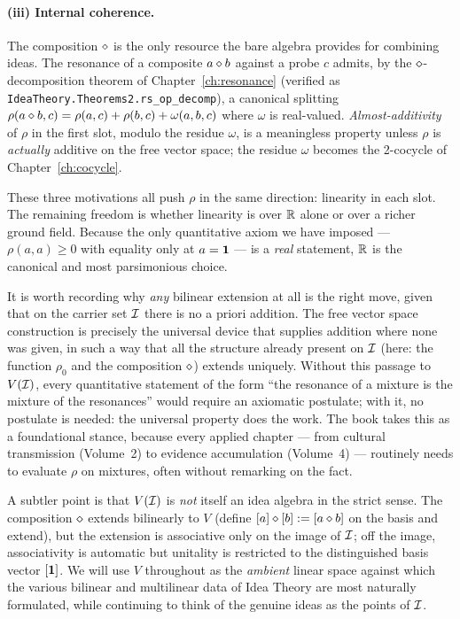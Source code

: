 \paragraph{(iii) Internal coherence.}
The composition $\mathbin{\diamond}$ is the only resource the bare algebra provides
for combining ideas. The resonance of a composite $a\mathbin{\diamond} b$ against a
probe $c$ admits, by the $\mathbin{\diamond}$-decomposition theorem of
Chapter~\ref{ch:resonance} (verified as
\texttt{IdeaTheory.Theorems2.rs\_op\_decomp}), a canonical splitting
$\rho(a\mathbin{\diamond} b,c)=\rho(a,c)+\rho(b,c)+\omega(a,b,c)$ where $\omega$ is
real-valued. \emph{Almost-additivity} of $\rho$ in the first slot, modulo
the residue $\omega$, is a meaningless property unless $\rho$ is
\emph{actually} additive on the free vector space; the residue $\omega$
becomes the 2-cocycle of Chapter~\ref{ch:cocycle}.

These three motivations all push $\rho$ in the same direction: linearity in
each slot. The remaining freedom is whether linearity is over $\mathbb{R}$ alone
or over a richer ground field. Because the only quantitative axiom we have
imposed --- $\rho(a,a)\ge 0$ with equality only at $a=\mathbf{1}$ --- is a
\emph{real} statement, $\mathbb{R}$ is the canonical and most parsimonious choice.

It is worth recording why \emph{any} bilinear extension at all is the right
move, given that on the carrier set $\mathcal{I}$ there is no a priori
addition. The free vector space construction is precisely the universal
device that supplies addition where none was given, in such a way that all
the structure already present on $\mathcal{I}$ (here: the function $\rho_0$ and
the composition $\mathbin{\diamond}$) extends uniquely. Without this passage to
$V(\mathcal{I})$, every quantitative statement of the form ``the resonance of a
mixture is the mixture of the resonances'' would require an axiomatic
postulate; with it, no postulate is needed: the universal property does
the work. The book takes this as a foundational stance, because every
applied chapter --- from cultural transmission (Volume~2) to evidence
accumulation (Volume~4) --- routinely needs to evaluate $\rho$ on
mixtures, often without remarking on the fact.

A subtler point is that $V(\mathcal{I})$ is \emph{not} itself an idea algebra
in the strict sense. The composition $\mathbin{\diamond}$ extends bilinearly to $V$
(define $[a]\mathbin{\diamond}[b]:=[a\mathbin{\diamond} b]$ on the basis and extend), but the
extension is associative only on the image of $\mathcal{I}$; off the image,
associativity is automatic but unitality is restricted to the
distinguished basis vector $[\mathbf{1}]$. We will use $V$ throughout as the
\emph{ambient} linear space against which the various bilinear and
multilinear data of Idea Theory are most naturally formulated, while
continuing to think of the genuine ideas as the points of $\mathcal{I}$.

